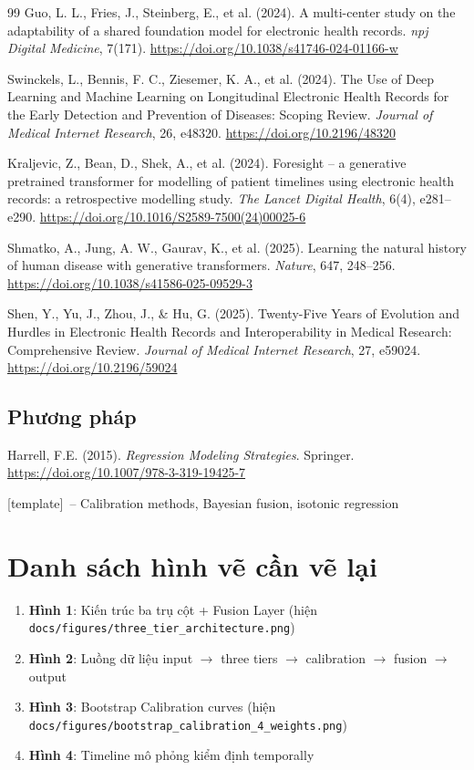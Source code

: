 \documentclass[13pt,a4paper]{article}
\newcommand{\template}{{\color{red}[template]}}
\begin{document}
\begin{thebibliography}{99}
Guo, L. L., Fries, J., Steinberg, E., et al. (2024). A multi-center study on the adaptability of a shared foundation model for electronic health records. \textit{npj Digital Medicine}, 7(171). \url{https://doi.org/10.1038/s41746-024-01166-w}

Swinckels, L., Bennis, F. C., Ziesemer, K. A., et al. (2024). The Use of Deep Learning and Machine Learning on Longitudinal Electronic Health Records for the Early Detection and Prevention of Diseases: Scoping Review. \textit{Journal of Medical Internet Research}, 26, e48320. \url{https://doi.org/10.2196/48320}

Kraljevic, Z., Bean, D., Shek, A., et al. (2024). Foresight -- a generative pretrained transformer for modelling of patient timelines using electronic health records: a retrospective modelling study. \textit{The Lancet Digital Health}, 6(4), e281--e290. \url{https://doi.org/10.1016/S2589-7500(24)00025-6}

Shmatko, A., Jung, A. W., Gaurav, K., et al. (2025). Learning the natural history of human disease with generative transformers. \textit{Nature}, 647, 248--256. \url{https://doi.org/10.1038/s41586-025-09529-3}

Shen, Y., Yu, J., Zhou, J., \& Hu, G. (2025). Twenty-Five Years of Evolution and Hurdles in Electronic Health Records and Interoperability in Medical Research: Comprehensive Review. \textit{Journal of Medical Internet Research}, 27, e59024. \url{https://doi.org/10.2196/59024}

\subsection{Phương pháp}

Harrell, F.E. (2015). \textit{Regression Modeling Strategies}. Springer. \url{https://doi.org/10.1007/978-3-319-19425-7}

\template\ -- Calibration methods, Bayesian fusion, isotonic regression

\end{thebibliography}

\section*{Danh sách hình vẽ cần vẽ lại}

\begin{enumerate}
    \item \textbf{Hình 1}: Kiến trúc ba trụ cột + Fusion Layer (hiện \texttt{docs/figures/three\_tier\_architecture.png})
    \item \textbf{Hình 2}: Luồng dữ liệu input $\to$ three tiers $\to$ calibration $\to$ fusion $\to$ output
    \item \textbf{Hình 3}: Bootstrap Calibration curves (hiện \texttt{docs/figures/bootstrap\_calibration\_4\_weights.png})
    \item \textbf{Hình 4}: Timeline mô phỏng kiểm định temporally
\end{enumerate}
\end{document}
